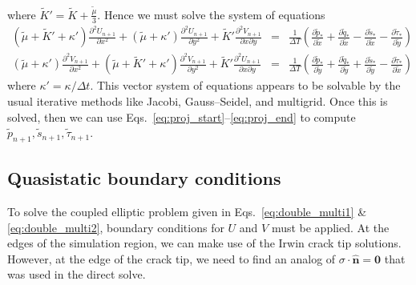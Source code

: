 \documentclass[12pt]{article}
\newcommand{\p}{\partial}
\newcommand{\xT}{\tilde{x}}
\newcommand{\yT}{\tilde{y}}
\newcommand{\KT}{\tilde{K}}
\newcommand{\pT}{\tilde{p}}
\newcommand{\sT}{\tilde{s}}
\newcommand{\qT}{\tilde{q}}
\newcommand{\tauT}{\tilde{\tau}}
\newcommand{\muT}{\tilde{\mu}}
\newcommand{\prxT}[1]{\frac{\p #1}{\p \xT}}
\newcommand{\pryT}[1]{\frac{\p #1}{\p \yT}}
\renewcommand{\vec}[1]{\mathbf{#1}}
\begin{document}
where $\KT'=\KT+\frac{\muT}{3}$. Hence we must solve the system of equations
{\small\begin{eqnarray}
  \label{eq:double_multi1} (\muT+\KT'+\kappa') \frac{\p^2 U_{n+1}}{\p x^2} + (\muT+\kappa') \frac{\p^2 U_{n+1}}{\p y^2} + \KT' \frac{\p^2 V_{n+1}}{\p x \p y} &=& \frac{1}{\Delta T} \left(\prxT{\pT_*}+\prxT{\qT_*}-\prxT{\sT_*}-\pryT{\tauT_*}\right) \\
  \label{eq:double_multi2} (\muT+\kappa') \frac{\p^2 V_{n+1}}{\p x^2} + (\muT+\KT'+\kappa') \frac{\p^2 V_{n+1}}{\p y^2} + \KT' \frac{\p^2 U_{n+1}}{\p x \p y}&=& \frac{1}{\Delta T} \left( \pryT{\pT_*}+\pryT{\qT_*}+\pryT{\sT_*}-\prxT{\tauT_*} \right)
\end{eqnarray}}
where $\kappa'=\kappa/\Delta t$. This vector system of equations appears to be
solvable by the usual iterative methods like Jacobi, Gauss--Seidel, and
multigrid. Once this is solved, then we can use
Eqs.~\ref{eq:proj_start}--\ref{eq:proj_end} to compute $\pT_{n+1}, \sT_{n+1},
\tauT_{n+1}$.

\subsection*{Quasistatic boundary conditions}
To solve the coupled elliptic problem given in Eqs.~\ref{eq:double_multi1} \&
\ref{eq:double_multi2}, boundary conditions for $U$ and $V$ must be applied. At
the edges of the simulation region, we can make use of the Irwin crack tip
solutions. However, at the edge of the crack tip, we need to find an analog of
$\sigma \cdot \hat{\vec{n}}=\vec{0}$ that was used in the direct solve.
\end{document}
